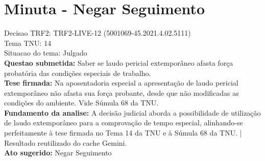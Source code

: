 \documentclass{article}
\begin{document}
\section*{Minuta - Negar Seguimento}
Decisao TRF2: TRF2-LIVE-12 (5001069-45.2021.4.02.5111)\\
Tema TNU: 14\\
Situacao do tema: Julgado\\
\textbf{Questao submetida:} Saber se laudo pericial extemporâneo afasta força probatória das condições especiais de trabalho.\\
\textbf{Tese firmada:} Na aposentadoria especial a apresentação de laudo pericial extemporâneo não afasta sua força probante, desde que não modificadas as condições do ambiente. Vide Súmula 68 da TNU.\\
\textbf{Fundamento da analise:} A decisão judicial aborda a possibilidade de utilização de laudo extemporâneo para a comprovação de tempo especial, alinhando-se perfeitamente à tese firmada no Tema 14 da TNU e à Súmula 68 da TNU. | Resultado reutilizado do cache Gemini.\\
\textbf{Ato sugerido:} Negar Seguimento
\end{document}

